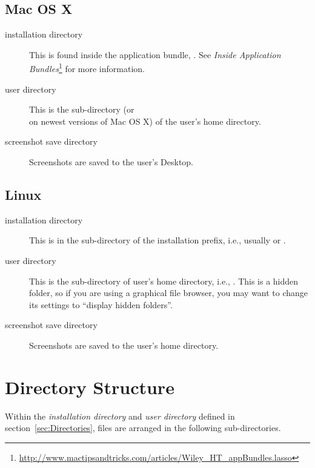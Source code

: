 \subsection{Mac OS X}
\label{sec:FilesAndDirectories:MacOSX}

\begin{description}
\item[installation directory] This is found inside the application
  bundle, . See \emph{Inside Application
    Bundles}\footnote{\url{http://www.mactipsandtricks.com/articles/Wiley_HT_appBundles.lasso}}
  for more information.
\item[user directory] This is the sub-directory 
   (or \\
   on
  newest versions of Mac OS X) of the user's home
  directory.
\item[screenshot save directory] Screenshots are saved to the user's
  Desktop.
\end{description}

\subsection{Linux}
\label{sec:FilesAndDirectories:Linux}

\begin{description}
\item[installation directory] This is in the
   sub-directory of the installation prefix,
  i.e., usually  or
  .
\item[user directory] This is the  sub-directory of
  user's home directory, i.e.,
  . This is a hidden folder, so
  if you are using a graphical file browser, you may want to change
  its settings to ``display hidden folders''.
\item[screenshot save directory] Screenshots are saved to the user's
  home directory.
\end{description}

\section{Directory Structure}
\label{sec:FilesAndDirectories:DirectoryStructure}

Within the \emph{installation directory} and \emph{user directory}
defined in section~\ref{sec:Directories}, files are arranged in the
following sub-directories.

